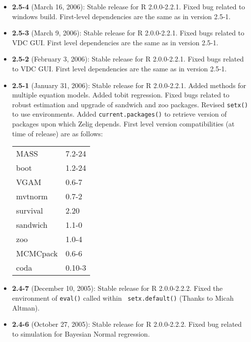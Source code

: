 \documentclass[oneside,letterpaper,12pt]{book}
\begin{document}
\begin{itemize} 

\item {\bf 2.5-4} (March 16, 2006): Stable release for R 2.0.0-2.2.1.  Fixed bug 
related to windows build.  First-level dependencies are the same as in version 
2.5-1.

\item {\bf 2.5-3} (March 9, 2006): Stable release for R 2.0.0-2.2.1.  Fixed bugs 
related to VDC GUI.  First level dependencies are the same as in version 2.5-1.  

\item {\bf 2.5-2} (February 3, 2006): Stable release for R 2.0.0-2.2.1.  Fixed bugs 
related to VDC GUI.  First level dependencies are the same as in version 2.5-1.

\item {\bf 2.5-1} (January 31, 2006): Stable release 
for R 2.0.0-2.2.1.  Added methods for multiple equation models.  Added
tobit regression.  Fixed bugs related to robust estimation and upgrade of sandwich and 
zoo packages.  Revised {\tt setx()} to use environments.  Added 
{\tt current.packages()} to retrieve version of packages upon which Zelig 
depends.  First level version compatibilities (at time of release) 
are as follows: \newline
\begin{tabular}{ll}\label{table.compat}
     MASS       & 7.2-24 \\
     boot       & 1.2-24 \\
     VGAM       & 0.6-7 \\
     mvtnorm    & 0.7-2 \\ 
     survival   & 2.20  \\
     sandwich   & 1.1-0 \\
     zoo        & 1.0-4 \\
     MCMCpack   & 0.6-6 \\
     coda       & 0.10-3 \\
\end{tabular}

\item \textbf{2.4-7} (December 10, 2005): Stable release for R 
2.0.0-2.2.2.  Fixed the environment of {\tt eval()} called within {\tt
  setx.default()} (Thanks to Micah Altman).

\item \textbf{2.4-6} (October 27, 2005): Stable release for R 
2.0.0-2.2.2.  Fixed bug related to simulation for Bayesian Normal regression.


\end{itemize}
\end{document}
